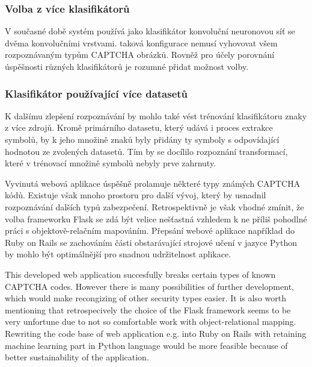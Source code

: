 \documentclass[
  field=ainfp,
  master=true,
  biblatex,
  sourcecodes=false,
  theorems=false,
  glossaries,
  index
]{kidiplom}
\begin{document}
\subsubsection*{Volba z více klasifikátorů} 
V současné době systém používá jako klasifikátor konvoluční neuronovou síť se dvěma konvolučními vrstvami. taková konfigurace nemusí vyhovovat všem rozpoznávaným typům CAPTCHA obrázků. Rovněž pro účely porovnání úspěšnosti různých klasifikátorů je rozumné přidat možnost volby. 

\subsubsection*{Klasifikátor používající více datasetů} 
K dalšímu zlepšení rozpoznávání by mohlo také vést trénování klasifikátoru znaky z více zdrojů. Kromě primárního datasetu, který udává i proces extrakce symbolů, by k jeho množině znaků byly přidány ty symboly s odpovídající hodnotou ze zvolených datasetů. Tím by se docílilo rozpoznání transformací, které v trénovací množině symbolů nebyly prve zahrnuty.


\begin{kiconclusions}
Vyvinutá webová aplikace úspěšně prolamuje některé typy známých CAPTCHA kódů. Existuje však mnoho prostoru pro další vývoj, který by usnadnil rozpoznávání dalších typů zabezpečení. Retrospektivně je však vhodné zmínit, že volba frameworku Flask se zdá být velice nešťastná vzhledem k ne příliš pohodlné práci s objektově-relačním mapováním. Přepsání webové aplikace například do Ruby on Rails se zachováním části obstarávající strojové učení v jazyce Python by mohlo být optimálnější pro snadnou udržitelnost aplikace.
\end{kiconclusions}

\begin{kiconclusions}[english]
This developed web application succesfully breaks certain types of known CAPTCHA codes. However there is many possibilities of further development, which would make recongizing of other security types easier.  It is also worth mentioning that retrospecively the choice of the Flask framework seems to be very unfortune due to not so comfortable work with object-relational mapping. Rewriting the code base of web application e.g. into Ruby on Rails with retaining machine learning part in Python language would be more feasible because of better sustainability of the application. 
\end{kiconclusions}
\end{document}
